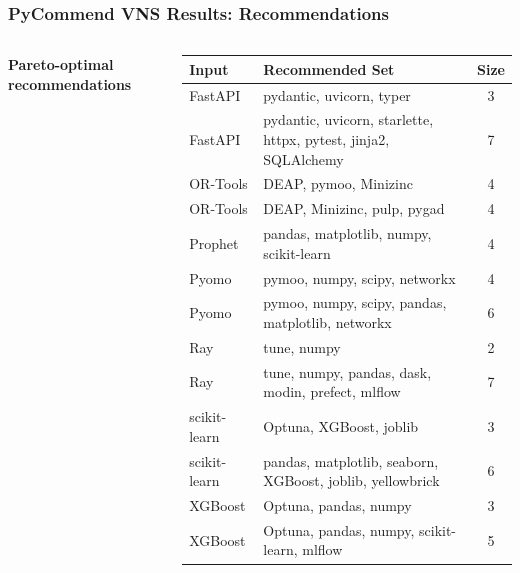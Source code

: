 \documentclass{beamer}
\begin{document}
\begin{frame}
\frametitle{PyCommend VNS Results: Recommendations}

\begin{columns}[T]
\textbf{Pareto-optimal recommendations} 
\begingroup
\footnotesize
\begin{table}[h]
\centering
\setlength{\tabcolsep}{4pt}
\begin{tabular}{p{1.7cm}p{8.5cm}c}
\toprule
\textbf{Input} & \textbf{Recommended Set} & \textbf{Size} \\
\midrule
FastAPI & pydantic, uvicorn, typer & 3 \\
FastAPI & pydantic, uvicorn, starlette, httpx, pytest, jinja2, SQLAlchemy & 7 \\
OR-Tools & DEAP, pymoo,  Minizinc & 4 \\
OR-Tools & DEAP, Minizinc, pulp, pygad & 4 \\
Prophet & pandas, matplotlib, numpy, scikit-learn & 4 \\
Pyomo & pymoo, numpy, scipy, networkx & 4 \\
Pyomo & pymoo, numpy, scipy, pandas, matplotlib, networkx & 6 \\
Ray & tune, numpy & 2 \\
Ray & tune, numpy, pandas, dask, modin, prefect, mlflow & 7 \\
scikit-learn & Optuna, XGBoost, joblib & 3 \\
scikit-learn & pandas, matplotlib, seaborn, XGBoost, joblib, yellowbrick & 6 \\
XGBoost & Optuna, pandas, numpy & 3 \\
XGBoost & Optuna, pandas, numpy, scikit-learn, mlflow & 5 \\
\bottomrule
\end{tabular}
\end{table}
\endgroup
\end{columns}
\end{frame}
\end{document}
